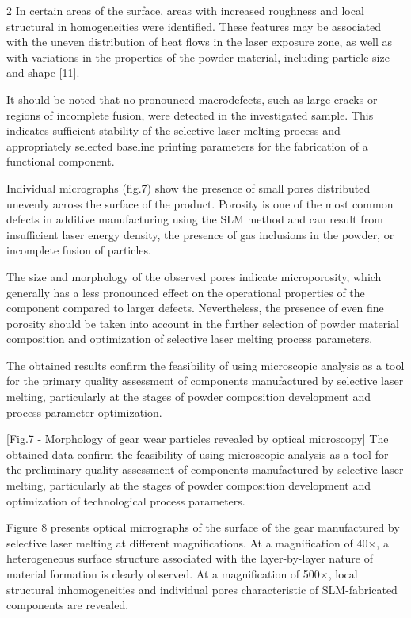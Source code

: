 \begin{multicols}{2}
In certain areas of the surface, areas with increased roughness and
local structural in homogeneities were identified. These features may be
associated with the uneven distribution of heat flows in the laser
exposure zone, as well as with variations in the properties of the
powder material, including particle size and shape {[}11{]}.

It should be noted that no pronounced macrodefects, such as large cracks
or regions of incomplete fusion, were detected in the investigated
sample. This indicates sufficient stability of the selective laser
melting process and appropriately selected baseline printing parameters
for the fabrication of a functional component.

Individual micrographs (fig.7) show the presence of small pores
distributed unevenly across the surface of the product. Porosity is one
of the most common defects in additive manufacturing using the SLM
method and can result from insufficient laser energy density, the
presence of gas inclusions in the powder, or incomplete fusion of
particles.

The size and morphology of the observed pores indicate microporosity,
which generally has a less pronounced effect on the operational
properties of the component compared to larger defects. Nevertheless,
the presence of even fine porosity should be taken into account in the
further selection of powder material composition and optimization of
selective laser melting process parameters.

The obtained results confirm the feasibility of using microscopic
analysis as a tool for the primary quality assessment of components
manufactured by selective laser melting, particularly at the stages of
powder composition development and process parameter optimization.

[Fig.7 - Morphology of gear wear
particles revealed by optical microscopy]
\vspace{-1em}
The obtained data confirm the feasibility of using microscopic analysis
as a tool for the preliminary quality assessment of components
manufactured by selective laser melting, particularly at the stages of
powder composition development and optimization of technological process
parameters.

Figure 8 presents optical micrographs of the surface of the gear
manufactured by selective laser melting at different magnifications. At
a magnification of 40×, a heterogeneous surface structure associated
with the layer-by-layer nature of material formation is clearly
observed. At a magnification of 500×, local structural inhomogeneities
and individual pores characteristic of SLM-fabricated components are
revealed.
\end{multicols}

